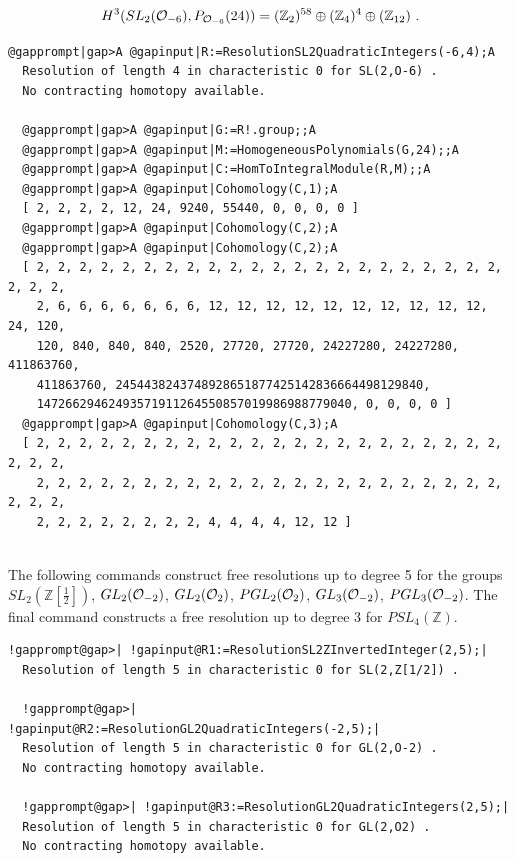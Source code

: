 \documentclass[a4paper,11pt]{report}
\begin{document}
{{\[H^3(SL_2({\cal O}_{-6}),P_{{\cal O}_{-6}}(24)) = (\mathbb Z_2)^{58} \oplus
(\mathbb Z_{4})^4 \oplus (\mathbb Z_{12})\ . \]
 
\begin{Verbatim}[commandchars=@|A,fontsize=\small,frame=single,label=Example]
  @gapprompt|gap>A @gapinput|R:=ResolutionSL2QuadraticIntegers(-6,4);A
  Resolution of length 4 in characteristic 0 for SL(2,O-6) . 
  No contracting homotopy available. 
  
  @gapprompt|gap>A @gapinput|G:=R!.group;;A
  @gapprompt|gap>A @gapinput|M:=HomogeneousPolynomials(G,24);;A
  @gapprompt|gap>A @gapinput|C:=HomToIntegralModule(R,M);;A
  @gapprompt|gap>A @gapinput|Cohomology(C,1);A
  [ 2, 2, 2, 2, 12, 24, 9240, 55440, 0, 0, 0, 0 ]
  @gapprompt|gap>A @gapinput|Cohomology(C,2);A
  @gapprompt|gap>A @gapinput|Cohomology(C,2);A
  [ 2, 2, 2, 2, 2, 2, 2, 2, 2, 2, 2, 2, 2, 2, 2, 2, 2, 2, 2, 2, 2, 2, 2, 2, 2, 
    2, 6, 6, 6, 6, 6, 6, 6, 12, 12, 12, 12, 12, 12, 12, 12, 12, 12, 24, 120, 
    120, 840, 840, 840, 2520, 27720, 27720, 24227280, 24227280, 411863760, 
    411863760, 2454438243748928651877425142836664498129840, 
    14726629462493571911264550857019986988779040, 0, 0, 0, 0 ]
  @gapprompt|gap>A @gapinput|Cohomology(C,3);A
  [ 2, 2, 2, 2, 2, 2, 2, 2, 2, 2, 2, 2, 2, 2, 2, 2, 2, 2, 2, 2, 2, 2, 2, 2, 2, 
    2, 2, 2, 2, 2, 2, 2, 2, 2, 2, 2, 2, 2, 2, 2, 2, 2, 2, 2, 2, 2, 2, 2, 2, 2, 
    2, 2, 2, 2, 2, 2, 2, 2, 4, 4, 4, 4, 12, 12 ]
  
\end{Verbatim}
 

The following commands construct free resolutions up to degree 5 for the
groups $SL_2(\mathbb Z[\frac{1}{2}])$, $GL_2({\cal O}_{-2})$, $GL_2({\cal O}_{2})$, $PGL_2({\cal O}_{2})$, $GL_3({\cal O}_{-2})$, $PGL_3({\cal O}_{-2})$. The final command constructs a free resolution up to degree 3 for $PSL_4(\mathbb Z)$. 
\begin{Verbatim}[commandchars=!@|,fontsize=\small,frame=single,label=Example]
  !gapprompt@gap>| !gapinput@R1:=ResolutionSL2ZInvertedInteger(2,5);|
  Resolution of length 5 in characteristic 0 for SL(2,Z[1/2]) . 
  
  !gapprompt@gap>| !gapinput@R2:=ResolutionGL2QuadraticIntegers(-2,5);|
  Resolution of length 5 in characteristic 0 for GL(2,O-2) . 
  No contracting homotopy available. 
  
  !gapprompt@gap>| !gapinput@R3:=ResolutionGL2QuadraticIntegers(2,5);|
  Resolution of length 5 in characteristic 0 for GL(2,O2) . 
  No contracting homotopy available. 
  

\end{Verbatim}}}
\end{document}
